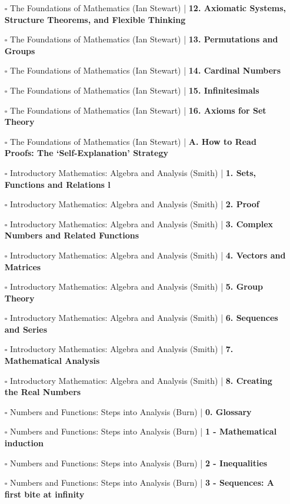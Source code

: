\documentclass[a4, landscape, 12pt]{article}
\newcommand{\checkbox}{$\square$}%
\begin{document}
\begin{itemize}
{}
\item [\checkbox] The Foundations of Mathematics (Ian Stewart)  | \textbf{12. Axiomatic Systems, Structure Theorems, and Flexible Thinking
}
\item [\checkbox] The Foundations of Mathematics (Ian Stewart)  | \textbf{13. Permutations and Groups
}
\item [\checkbox] The Foundations of Mathematics (Ian Stewart)  | \textbf{14. Cardinal Numbers
}
\item [\checkbox] The Foundations of Mathematics (Ian Stewart)  | \textbf{15. Infinitesimals
}
\item [\checkbox] The Foundations of Mathematics (Ian Stewart)  | \textbf{16. Axioms for Set Theory
}
\item [\checkbox] The Foundations of Mathematics (Ian Stewart)  | \textbf{A. How to Read Proofs: The ‘Self-Explanation’ Strategy
}
\item [\checkbox] Introductory Mathematics: Algebra and Analysis (Smith)  | \textbf{1. Sets, Functions and Relations l
}
\item [\checkbox] Introductory Mathematics: Algebra and Analysis (Smith)  | \textbf{2. Proof
}
\item [\checkbox] Introductory Mathematics: Algebra and Analysis (Smith)  | \textbf{3. Complex Numbers and Related Functions
}
\item [\checkbox] Introductory Mathematics: Algebra and Analysis (Smith)  | \textbf{4. Vectors and Matrices
}
\item [\checkbox] Introductory Mathematics: Algebra and Analysis (Smith)  | \textbf{5. Group Theory
}
\item [\checkbox] Introductory Mathematics: Algebra and Analysis (Smith)  | \textbf{6. Sequences and Series
}
\item [\checkbox] Introductory Mathematics: Algebra and Analysis (Smith)  | \textbf{7. Mathematical Analysis
}
\item [\checkbox] Introductory Mathematics: Algebra and Analysis (Smith)  | \textbf{8. Creating the Real Numbers
}
\item [\checkbox] Numbers and Functions: Steps into Analysis (Burn)  | \textbf{0. Glossary
}
\item [\checkbox] Numbers and Functions: Steps into Analysis (Burn)  | \textbf{1 - Mathematical induction
}
\item [\checkbox] Numbers and Functions: Steps into Analysis (Burn)  | \textbf{2 - Inequalities
}
\item [\checkbox] Numbers and Functions: Steps into Analysis (Burn)  | \textbf{3 - Sequences: A first bite at infinity
}
\end{itemize}
\end{document}
